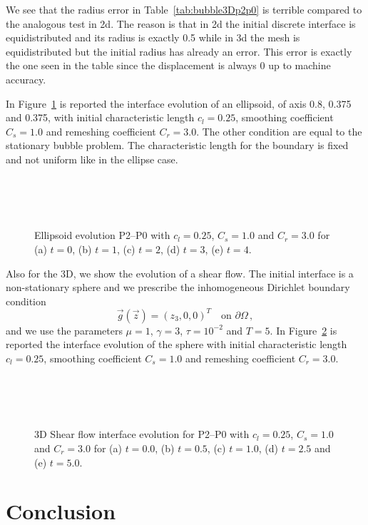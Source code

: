 \documentclass[a4paper,12pt,onecolumn]{article}
\begin{document}
We see that the radius error in Table~\ref{tab:bubble3Dp2p0} is terrible compared to the analogous test in 2d. The reason is that in 2d the initial discrete interface is equidistributed and its radius is exactly 0.5 while in 3d the mesh is equidistributed but the initial radius has already an error. This error is exactly the one seen in the table since the displacement is always 0 up to machine accuracy. 

In Figure~\ref{fig:ellipsoid} is reported the interface evolution of an ellipsoid, of axis 0.8, 0.375 and 0.375, with initial characteristic length $c_l=0.25$, smoothing coefficient $C_s=1.0$ and remeshing coefficient $C_r=3.0$. The other condition are equal to the stationary bubble problem. The characteristic length for the boundary is fixed and not uniform like in the ellipse case.

\begin{figure}[htbp]
  \centering
  \\
  \quad
  \\
  \quad
  \\
  \caption{Ellipsoid evolution P2--P0 with $c_l=0.25$, $C_s=1.0$ and $C_r=3.0$ for (a) $t=0$, (b) $t=1$, (c) $t=2$, (d) $t=3$, (e) $t=4$.}
  \label{fig:ellipsoid}
\end{figure}

Also for the 3D, we show the evolution of a shear flow. The initial interface is a non-stationary sphere and we prescribe the inhomogeneous Dirichlet boundary condition
\begin{equation*}
\vec g(\vec z)=(z_3,0,0)^T\quad \mbox{on }\partial\Omega\,,
\end{equation*}
and we use the parameters $\mu=1$, $\gamma=3$, $\tau=10^{-2}$ and $T=5$. In Figure~\ref{fig:shear_3d} is reported the interface evolution of the sphere with initial characteristic length $c_l=0.25$, smoothing coefficient $C_s=1.0$ and remeshing coefficient $C_r=3.0$. 
\begin{figure}[htbp]
  \centering
  \\
  \quad
  \\
  \quad
  \\
  \caption{3D Shear flow interface evolution for P2--P0 with $c_l=0.25$, $C_s=1.0$ and $C_r=3.0$ for (a) $t=0.0$, (b) $t=0.5$, (c) $t=1.0$, (d) $t=2.5$ and (e) $t=5.0$.}
  \label{fig:shear_3d}
\end{figure}

\section{Conclusion}\label{sec:conclusion}

\newpage
 

\end{document}
